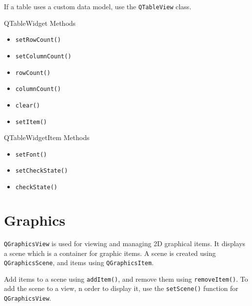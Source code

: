 \documentclass[notes.tex]{subfiles}
\begin{document}
			If a table uses a custom data model, use the \verb|QTableView| class.
			\begin{sidenote}{QTableWidget Methods}
				\vspace{-0.5cm}
				\begin{multicols}{3}
					\begin{itemize}[nosep]
						\item \verb|setRowCount()|
						\item \verb|setColumnCount()|
						\item \verb|rowCount()|
						\item \verb|columnCount()|
						\item \verb|clear()|
						\item \verb|setItem()|
					\end{itemize}
				\end{multicols}
			\end{sidenote}
			\begin{sidenote}{QTableWidgetItem Methods}
				\vspace{-0.5cm}
				\begin{multicols}{3}
					\begin{itemize}[nosep]
						\item \verb|setFont()|
						\item \verb|setCheckState()|
						\item \verb|checkState()|
					\end{itemize}
				\end{multicols}
			\end{sidenote}

		\section{Graphics}
			\verb|QGraphicsView| is used for viewing and managing 2D graphical items. It displays a scene which is a container for graphic items. A scene is created using \verb|QGraphicsScene|, and items using \verb|QGraphicsItem|.

			Add items to a scene using \verb|addItem()|, and remove them using \verb|removeItem()|. To add the scene to a view, n order to display it, use the \verb|setScene()| function for \verb|QGraphicsView|.

\end{document}
